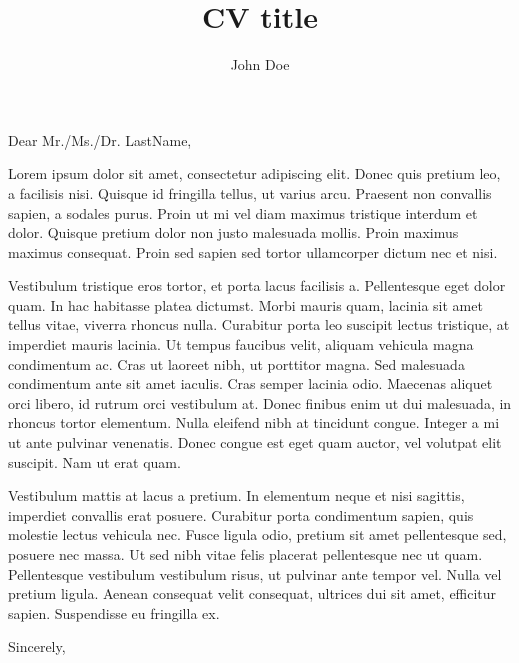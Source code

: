 \documentclass[12pt, a4paper]{effectivecv}
\author{John Doe}
\title{CV title}
\begin{document}
\cvheader




Dear Mr./Ms./Dr. LastName,

Lorem ipsum dolor sit amet, consectetur adipiscing elit. Donec quis pretium leo, a facilisis nisi. Quisque id fringilla tellus, ut varius arcu. Praesent non convallis sapien, a sodales purus. Proin ut mi vel diam maximus tristique interdum et dolor. Quisque pretium dolor non justo malesuada mollis. Proin maximus maximus consequat. Proin sed sapien sed tortor ullamcorper dictum nec et nisi.

Vestibulum tristique eros tortor, et porta lacus facilisis a. Pellentesque eget dolor quam. In hac habitasse platea dictumst. Morbi mauris quam, lacinia sit amet tellus vitae, viverra rhoncus nulla. Curabitur porta leo suscipit lectus tristique, at imperdiet mauris lacinia. Ut tempus faucibus velit, aliquam vehicula magna condimentum ac. Cras ut laoreet nibh, ut porttitor magna. Sed malesuada condimentum ante sit amet iaculis. Cras semper lacinia odio. Maecenas aliquet orci libero, id rutrum orci vestibulum at. Donec finibus enim ut dui malesuada, in rhoncus tortor elementum. Nulla eleifend nibh at tincidunt congue. Integer a mi ut ante pulvinar venenatis. Donec congue est eget quam auctor, vel volutpat elit suscipit. Nam ut erat quam.

Vestibulum mattis at lacus a pretium. In elementum neque et nisi sagittis, imperdiet convallis erat posuere. Curabitur porta condimentum sapien, quis molestie lectus vehicula nec. Fusce ligula odio, pretium sit amet pellentesque sed, posuere nec massa. Ut sed nibh vitae felis placerat pellentesque nec ut quam. Pellentesque vestibulum vestibulum risus, ut pulvinar ante tempor vel. Nulla vel pretium ligula. Aenean consequat velit consequat, ultrices dui sit amet, efficitur sapien. Suspendisse eu fringilla ex. 

Sincerely,

\end{document}
